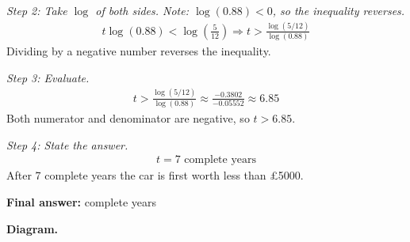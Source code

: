 \documentclass[11pt]{article}
\begin{document}
\textit{Step 2: Take \( \log \) of both sides. Note: \( \log(0.88) < 0 \), so the inequality reverses.}
\[\begin{gathered}
t\log(0.88) < \log\!\left(\frac{5}{12}\right) \Rightarrow t > \frac{\log(5/12)}{\log(0.88)}
\end{gathered}\]
Dividing by a negative number reverses the inequality.

\textit{Step 3: Evaluate.}
\[\begin{gathered}
t > \frac{\log(5/12)}{\log(0.88)} \approx \frac{-0.3802}{-0.05552} \approx 6.85
\end{gathered}\]
Both numerator and denominator are negative, so \( t > 6.85 \).

\textit{Step 4: State the answer.}
\[\begin{gathered}
t = 7 \text{ complete years}
\end{gathered}\]
After 7 complete years the car is first worth less than \pounds 5000.

\begin{answerbox}
\textbf{Final answer:} complete years
\end{answerbox}
\textbf{Diagram.}
\end{document}
